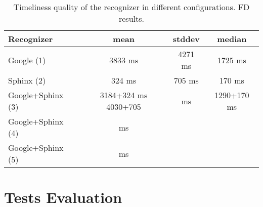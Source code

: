 \begin {table}
\label{tab:alignment_incr} 
\begin{center}
\caption {Timeliness quality of the recognizer in different configurations. FD
results.}
    \begin{tabular}{ l  c  c  c }
    \toprule
    Recognizer & mean & stddev & median \\ \toprule
    Google (1)  & 3833 ms & 4271 ms & 1725 ms  \\ 
    Sphinx (2)  & 324 ms & 705 ms & 170 ms \\ 
    Google+Sphinx (3)  & 3184+324 ms 4030+705 & ms & 1290+170 ms \\ 
    Google+Sphinx (4)  & ms  & & \\ 
    Google+Sphinx (5)  & ms  & &\\ \bottomrule   
    \end{tabular}
\end{center}
\end {table}

\section {Tests Evaluation} 